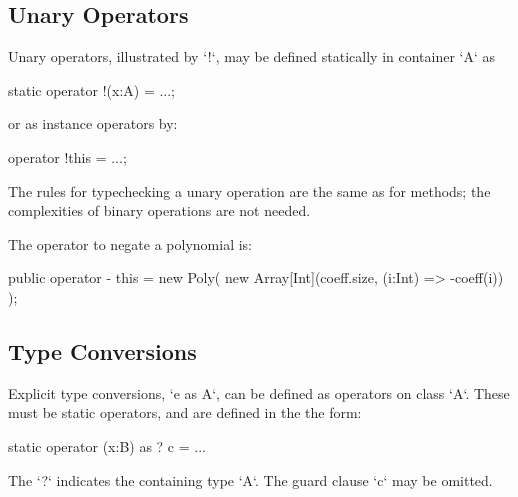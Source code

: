 \subsection{Unary Operators}

Unary operators,  illustrated by \xcd`!`, may be defined statically in
container 
\xcd`A` as 
\begin{xten}
static operator !(x:A) = ...;
\end{xten}
or as instance operators by: 
\begin{xten}
operator !this = ...;
\end{xten}


The rules for typechecking a unary operation are the same as for methods; the
complexities of binary operations are not needed.

\begin{ex}
The operator to negate a polynomial is: 

\begin{xten}
  public operator - this = new Poly(
    new Array[Int](coeff.size, (i:Int) => -coeff(i))
    );
\end{xten}



\end{ex}


\subsection{Type Conversions}
\label{sect:type-conv}


Explicit type conversions, \xcd`e as A`, can be defined as operators on
class \xcd`A`.  These must be static operators, and are defined in the 
the form: 
\begin{xten}
static operator (x:B) as ? {c} = ... 
\end{xten}
The \xcd`?` indicates the containing type \xcd`A`.  
The guard clause \xcd`{c}` may be omitted.



